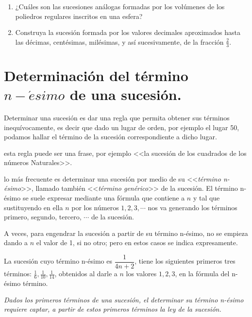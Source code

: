 \documentclass[oneside,english,spanish,2m,twoside,svgnames,x11names,HTML,twoside,12pt]{libro-matua}\usepackage[]{graphicx}\usepackage[]{color}
\begin{document}
\begin{ejercicios}[]
\begin{enumerate}
\item ¿Cuáles son las sucesiones análogas formadas por los volúmenes de
los poliedros regulares inscritos en una esfera?
\item Construya la sucesión formada por los valores decimales aproximados
hasta las décimas, centésimas, milésimas, y así sucesivamente, de
la fracción $\frac{2}{3}$.
\end{enumerate}
\end{ejercicios}

\section{Determinación del término $n-\acute{e}simo$ de una sucesión.}

Determinar una sucesión es dar una regla que permita obtener sus términos
inequívocamente, es decir que dado un lugar de orden, por ejemplo
el lugar 50, podamos hallar el término de la sucesión correspondiente
a dicho lugar.

esta regla puede ser una frase, por ejemplo <<la sucesión de los
cuadrados de los números Naturales>>.

lo más frecuente es determinar una sucesión por medio de su <<\textsl{término
n-ésimo}>>, llamado también <<\textsl{término genérico}>> de la
sucesión. El término n-ésimo se suele expresar mediante una fórmula
que contiene a $n$ y tal que sustituyendo en ella $n$ por los números
$1,2,3,\cdots$ nos va generando los términos primero, segundo, tercero,
$\cdots$ de la sucesión.

A veces, para engendrar la sucesión a partir de su término n-ésimo,
no se empieza dando a $n$ el valor de 1, si no otro; pero en estos
casos se indica expresamente.

\begin{ejemplo}

La sucesión cuyo término n-ésimo es $\dfrac{1}{4n+2}$, tiene los
siguientes primeros tres términos: $\frac{1}{6},\frac{1}{10},\frac{1}{14}$,
obtenidos al darle a $n$ los valores $1,2,3$, en la fórmula del
n-ésimo término. 

\end{ejemplo}

\textsl{\small{}Dados los primeros términos de una sucesión, el determinar
su término n-ésimo requiere captar, a partir de estos primeros términos
la ley de la sucesión.}{\small \par}
\end{document}
